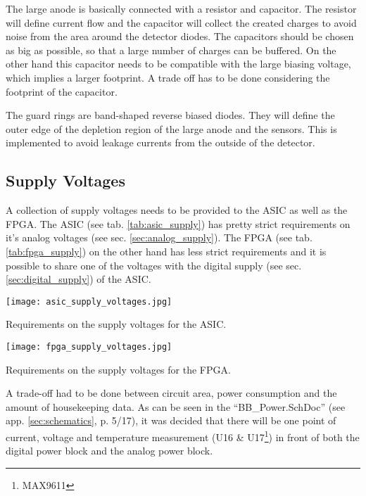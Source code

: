 The large anode is basically connected with a resistor and capacitor.
The resistor will define current flow and the capacitor will collect the created charges to avoid noise from the area around the detector diodes.
The capacitors should be chosen as big as possible, so that a large number of charges can be buffered.
On the other hand this capacitor needs to be compatible with the large biasing voltage, which implies a larger footprint.
A trade off has to be done considering the footprint of the capacitor.

The guard rings are band-shaped reverse biased diodes.
They will define the outer edge of the depletion region of the large anode and the sensors.
This is implemented to avoid leakage currents from the outside of the detector.

\subsection{Supply Voltages}
\label{sec:power_supplies}
A collection of supply voltages needs to be provided to the ASIC as well as the FPGA.
The ASIC (see tab. \ref{tab:asic_supply}) has pretty strict requirements on it's analog voltages (see sec. \ref{sec:analog_supply}).
The FPGA (see tab. \ref{tab:fpga_supply}) on the other hand has less strict requirements and it is possible to share one of the voltages with the digital supply (see sec. \ref{sec:digital_supply}) of the ASIC.
\begin{table}[H]
	\centering
    \texttt{[image: asic\_supply\_voltages.jpg]}
    \caption[ASIC Supply Voltages]{Requirements on the supply voltages for the ASIC.\cite[p. 82, tab. 44]{Meier2016VATA466}}
	\label{tab:asic_supply}
\end{table}
\begin{table}[H]
	\centering
    \texttt{[image: fpga\_supply\_voltages.jpg]}
    \caption[FPGA Supply Voltages]{Requirements on the supply voltages for the FPGA.\cite[p. 2-2, tab. 2-2]{microsemi2014military}}
	\label{tab:fpga_supply}
\end{table}

A trade-off had to be done between circuit area, power consumption and the amount of housekeeping data.
As can be seen in the ``BB\_Power.SchDoc'' (see app. \ref{sec:schematics}, p. 5/17), it was decided that there will be one point of current, voltage and temperature measurement (U16 \& U17\footnote{MAX9611}) in front of both the digital power block and the analog power block.

